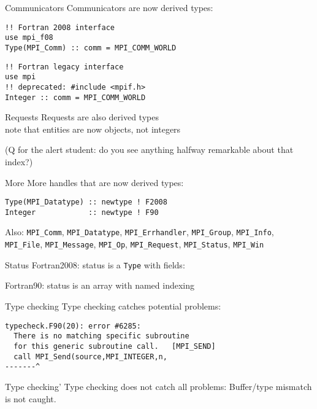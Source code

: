 \begin{numberedframe}{Communicators}
Communicators are now derived types:
\begin{lstlisting}
!! Fortran 2008 interface
use mpi_f08
Type(MPI_Comm) :: comm = MPI_COMM_WORLD
\end{lstlisting}
\begin{lstlisting}
!! Fortran legacy interface
use mpi
!! deprecated: #include <mpif.h>
Integer :: comm = MPI_COMM_WORLD
\end{lstlisting}
\end{numberedframe}

\begin{numberedframe}{Requests}
  Requests are also derived types\\
  note that  entities are now objects, not integers


  (Q for the alert student: do you see anything halfway
  remarkable about that index?)
\end{numberedframe}

\begin{numberedframe}{More}
  More handles that are now derived types:
\begin{lstlisting}
Type(MPI_Datatype) :: newtype ! F2008
Integer            :: newtype ! F90
\end{lstlisting}

Also:
  \lstinline{MPI_Comm}, \lstinline{MPI_Datatype},
  \lstinline{MPI_Errhandler}, \lstinline{MPI_Group},
  \lstinline{MPI_Info}, \lstinline{MPI_File}, \lstinline{MPI_Message},
            \lstinline{MPI_Op},
  \lstinline{MPI_Request}, \lstinline{MPI_Status}, \lstinline{MPI_Win}
\end{numberedframe}

\begin{numberedframe}{Status}
  Fortran2008: status is a \lstinline{Type} with fields:

  Fortran90: status is an array with named indexing
\end{numberedframe}

\begin{numberedframe}{Type checking}
  Type checking catches potential problems:
\begin{verbatim}
typecheck.F90(20): error #6285: 
  There is no matching specific subroutine
  for this generic subroutine call.   [MPI_SEND]
  call MPI_Send(source,MPI_INTEGER,n,
-------^
\end{verbatim}
\end{numberedframe}

\begin{numberedframe}{Type checking'}
  Type checking does not catch all problems:
  Buffer/type mismatch is not caught.
\end{numberedframe}

\lstset{language=C}
